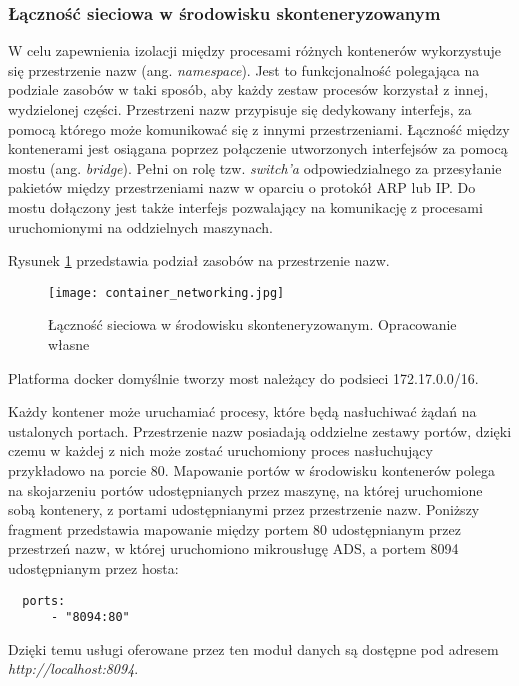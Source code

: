 \subsubsection{Łączność sieciowa w środowisku skonteneryzowanym}
\label{subsubection:lacznosc-sieciowa-docker}
W celu zapewnienia izolacji między procesami różnych kontenerów wykorzystuje się
przestrzenie nazw (ang. \textit{namespace}). Jest to funkcjonalność polegająca na podziale zasobów w taki sposób, aby
każdy zestaw procesów korzystał z innej, wydzielonej części. Przestrzeni nazw przypisuje się dedykowany
interfejs, za pomocą którego może komunikować się z innymi przestrzeniami. Łączność między kontenerami
jest osiągana poprzez połączenie utworzonych interfejsów za pomocą mostu (ang. \textit{bridge}).
Pełni on rolę tzw. \textit{switch'a} odpowiedzialnego za przesyłanie pakietów między przestrzeniami nazw
w oparciu o protokół ARP lub IP. Do mostu dołączony jest także interfejs pozwalający na komunikację
z procesami uruchomionymi na oddzielnych maszynach.

Rysunek \ref{fig:container-networking} przedstawia podział zasobów na przestrzenie nazw.

\begin{figure}[h]
  \centering
  \texttt{[image: container\_networking.jpg]}
  \caption{Łączność sieciowa w środowisku skonteneryzowanym. Opracowanie własne}
  \label{fig:container-networking}
\end{figure}

Platforma docker domyślnie tworzy most należący do podsieci 172.17.0.0/16.

Każdy kontener może uruchamiać procesy, które będą nasłuchiwać żądań na ustalonych portach.
Przestrzenie nazw posiadają oddzielne zestawy portów, dzięki czemu w każdej z nich może
zostać uruchomiony proces nasłuchujący przykładowo na porcie 80. Mapowanie portów w środowisku
kontenerów polega na skojarzeniu portów udostępnianych przez maszynę, na której uruchomione sobą
kontenery, z portami udostępnianymi przez przestrzenie nazw. Poniższy fragment przedstawia 
mapowanie między portem 80 udostępnianym przez przestrzeń nazw, w której uruchomiono mikrousługę ADS, 
a portem 8094 udostępnianym przez hosta:

\begin{lstlisting}
  ports:
      - "8094:80"
\end{lstlisting}

Dzięki temu usługi oferowane przez ten moduł danych są dostępne
pod adresem \textit{http://localhost:8094}.

